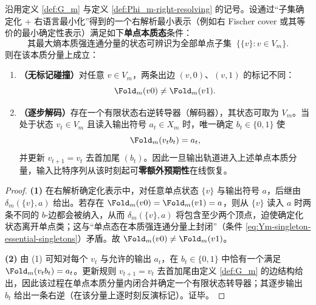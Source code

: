 \begin{corollary}[单点本质态 \texorpdfstring{$\Rightarrow$}{=>} 有限延迟右解码]\label{cor:Ym-singleton-essential-finite-delay}
沿用定义 \ref{def:G_m} 与定义 \ref{def:Phi_m-right-resolving} 的记号。设通过“子集确定化 + 右语言最小化”得到的一个右解析最小表示（例如右 Fischer cover 或其等价的最小确定性表示）满足如下\textbf{单点本质态}条件：
\begin{equation}\label{eq:Ym-singleton-essential-singletons}
\text{其最大熵本质强连通分量的状态可辨识为全部单点子集 }\ \{\{v\}:v\in V_m\}.
\end{equation}
则在该本质分量上成立：
\begin{enumerate}
  \item \textbf{（无标记碰撞）}对任意 \(v\in V_m\)，两条出边 \((v,0)\)、\((v,1)\) 的标记不同：
  \[
  \Fold_m(v0)\neq \Fold_m(v1).
  \]
  \item \textbf{（逐步解码）}存在一个有限状态右逆转导器（解码器），其状态可取为 \(V_m\)。当处于状态 \(v_t\in V_m\) 且读入输出符号 \(a_t\in X_m\) 时，唯一确定 \(b_t\in\{0,1\}\) 使
  \[
  \Fold_m(v_t b_t)=a_t,
  \]
  并更新 \(v_{t+1}=v_t\) 去首加尾 \((b_t)\)。因此一旦输出轨道进入上述单点本质分量，输入比特序列从该时刻起可\textbf{零额外预期性}在线恢复。
\end{enumerate}
\end{corollary}
\begin{proof}
\textbf{(1)} 在右解析确定化表示中，对任意单点状态 \(\{v\}\) 与输出符号 \(a\)，后继由
\(
\delta_m(\{v\},a)
\)
给出。若存在 \(\Fold_m(v0)=\Fold_m(v1)=a\)，则从 \(\{v\}\) 读入 \(a\) 时两条不同的 \(b\)-边都会被纳入，从而
\(
\delta_m(\{v\},a)
\)
将包含至少两个顶点，迫使确定化状态离开单点类；这与“单点态在本质强连通分量上封闭”（条件 \eqref{eq:Ym-singleton-essential-singletons}）矛盾。故 \(\Fold_m(v0)\neq \Fold_m(v1)\)。

\textbf{(2)} 由 (1) 可知对每个 \(v_t\) 与允许的输出 \(a_t\)，在 \(b_t\in\{0,1\}\) 中恰有一个满足 \(\Fold_m(v_t b_t)=a_t\)。更新规则 \(v_{t+1}=v_t\) 去首加尾由定义 \ref{def:G_m} 的边结构给出，因此该过程在单点本质分量内闭合并确定一个有限状态转导器；其逐步输出 \(b_t\) 给出一条右逆（在该分量上逐时刻反演标记）。证毕。
\end{proof}

